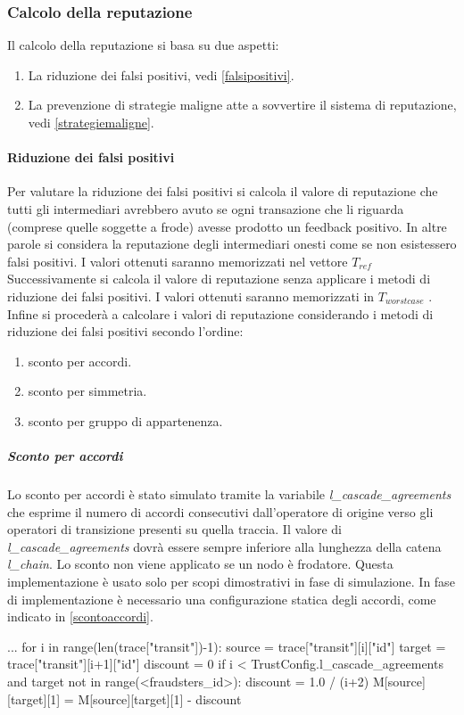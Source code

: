 
\subsubsection{Calcolo della reputazione}
Il calcolo della reputazione si basa su due aspetti:
\begin{enumerate}
\item La riduzione dei falsi positivi, vedi \ref{falsipositivi}.
\item La prevenzione di strategie maligne atte a sovvertire il sistema di reputazione, vedi \ref{strategiemaligne}.
\end{enumerate}

\paragraph{Riduzione dei falsi positivi}
Per valutare la riduzione dei falsi positivi si calcola il valore di reputazione che tutti gli intermediari avrebbero avuto se ogni transazione che li riguarda (comprese quelle soggette a frode)  avesse prodotto un feedback positivo. In altre parole si considera la reputazione degli intermediari onesti come se non esistessero falsi positivi. I valori ottenuti saranno memorizzati nel vettore  $T_{ref}$ \\
Successivamente si calcola il valore di reputazione senza applicare i metodi di riduzione dei falsi positivi.  I valori ottenuti saranno memorizzati in $T_{worstcase}$ . \\
Infine si procederà a calcolare i valori di reputazione considerando i metodi di riduzione dei falsi positivi secondo l'ordine:
\begin{enumerate}
\item sconto per accordi.
\item sconto per simmetria.
\item sconto per gruppo di appartenenza.
\end{enumerate}
\subparagraph{Sconto per accordi}
Lo sconto per accordi è stato simulato tramite la variabile \emph{l\_cascade\_agreements} che esprime il numero di accordi consecutivi dall'operatore di origine verso gli operatori di transizione presenti su quella traccia. Il valore di  \emph{l\_cascade\_agreements} dovrà essere sempre inferiore alla lunghezza della catena \emph{l\_chain}. Lo sconto non viene applicato se un nodo è frodatore.
Questa implementazione è usato solo per scopi dimostrativi in fase di simulazione. In fase di implementazione è necessario una configurazione statica degli accordi, come indicato in \ref{scontoaccordi}. 
\begin{python}
...
for i in range(len(trace["transit"])-1):
	source = trace["transit"][i]["id"]
	target = trace["transit"][i+1]["id"]
	discount = 0
	if i < TrustConfig.l_cascade_agreements and target not in range(<fraudsters_id>):
		discount = 1.0 / (i+2)
		M[source][target][1] = M[source][target][1] - discount
\end{python}


